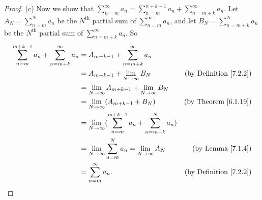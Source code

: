 \begin{proof}{(c)}
    Now we show that \(\sum_{n = m}^\infty a_n = \sum_{n = m}^{n + k - 1} a_n + \sum_{n = m + k}^\infty a_n\).
    Let \(A_N = \sum_{n = m}^N a_n\) be the \(N^{\text{th}}\) partial sum of \(\sum_{n = m}^\infty a_n\), and let \(B_N = \sum_{n = m + k}^N a_n\) be the \(N^{\text{th}}\) partial sum of \(\sum_{n = m + k}^\infty a_n\).
    So
    \begin{align*}
        \sum_{n = m}^{m + k - 1} a_n + \sum_{n = m + k}^\infty a_n & = A_{m + k - 1} + \sum_{n = m + k}^\infty a_n                                                                      \\
                                                                   & = A_{m + k - 1} + \lim_{N \to \infty} B_N                                     & \text{(by Definition \ref{7.2.2})} \\
                                                                   & = \lim_{N \to \infty} A_{m + k - 1} + \lim_{N \to \infty} B_N                                                      \\
                                                                   & = \lim_{N \to \infty} (A_{m + k - 1} + B_N)                                   & \text{(by Theorem \ref{6.1.19})}   \\
                                                                   & = \lim_{N \to \infty} (\sum_{n = m}^{m + k - 1} a_n + \sum_{n = m + k}^N a_n)                                      \\
                                                                   & = \lim_{N \to \infty} \sum_{n = m}^N a_n = \lim_{N \to \infty} A_N            & \text{(by Lemma \ref{7.1.4})}      \\
                                                                   & = \sum_{n = m}^\infty a_n.                                                    & \text{(by Definition \ref{7.2.2})}
    \end{align*}
\end{proof}

